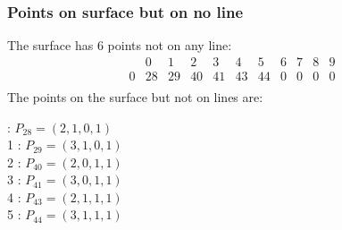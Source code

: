 \documentclass{article}
\begin{document}
{\subsubsection*{Points on surface but on no line}
The surface has 6 points not on any line:\\
$$
\begin{array}{r|*{10}{r}}
 & 0 & 1 & 2 & 3 & 4 & 5 & 6 & 7 & 8 & 9\\
\hline
0 & 28 & 29 & 40 & 41 & 43 & 44 & 0 & 0 & 0 & 0\\
\end{array}
$$
The points on the surface but not on lines are:\\
\begin{multicols}{2}
 : $P_{28}=( 2, 1, 0, 1 )$\\
1 : $P_{29}=( 3, 1, 0, 1 )$\\
2 : $P_{40}=( 2, 0, 1, 1 )$\\
3 : $P_{41}=( 3, 0, 1, 1 )$\\
4 : $P_{43}=( 2, 1, 1, 1 )$\\
5 : $P_{44}=( 3, 1, 1, 1 )$\\
\end{multicols}
}
\end{document}
